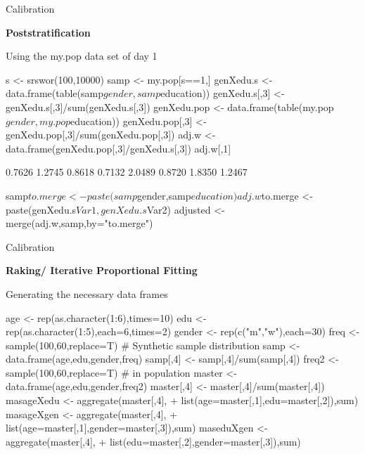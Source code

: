 \documentclass[11pt,german,hideothersubsections]{beamer}
\begin{document}
\begin{frame}[fragile]{Calibration}
\vspace{-.25cm}
\footnotesize{
\begin{center}
\textbf{Poststratification}
\end{center}

Using the my.pop data set of day 1
\begin{Schunk}
\begin{Sinput}
 s <- srswor(100,10000)
 samp <- my.pop[s==1,]
 genXedu.s <- data.frame(table(samp$gender,samp$education))
 genXedu.s[,3] <- genXedu.s[,3]/sum(genXedu.s[,3])
 genXedu.pop <- data.frame(table(my.pop$gender,my.pop$education))
 genXedu.pop[,3] <- genXedu.pop[,3]/sum(genXedu.pop[,3])
 adj.w <- data.frame(genXedu.pop[,3]/genXedu.s[,3])
 adj.w[,1]
\end{Sinput}
\begin{Soutput}
[1] 0.7626 1.2745 0.8618 0.7132 2.0489 0.8720 1.8350 1.2467
\end{Soutput}
\begin{Sinput}
 samp$to.merge <- paste(samp$gender,samp$education)
 adj.w$to.merge <- paste(genXedu.s$Var1,genXedu.s$Var2)
 adjusted <- merge(adj.w,samp,by="to.merge")
\end{Sinput}
\end{Schunk}
}
\end{frame}
\begin{frame}[fragile]{Calibration}
\vspace{-.25cm}
\footnotesize{
\begin{center}
\textbf{Raking/ Iterative Proportional Fitting}
\end{center}
Generating the necessary data frames
\begin{Schunk}
\begin{Sinput}
 age <- rep(as.character(1:6),times=10)
 edu <- rep(as.character(1:5),each=6,times=2)
 gender <- rep(c("m","w"),each=30)
 freq <- sample(100,60,replace=T)
 # Synthetic sample distribution
 samp <- data.frame(age,edu,gender,freq)
 samp[,4] <- samp[,4]/sum(samp[,4])
 freq2 <- sample(100,60,replace=T)
 # in population
 master <- data.frame(age,edu,gender,freq2)
 master[,4] <- master[,4]/sum(master[,4])
 masageXedu <- aggregate(master[,4],
+                         list(age=master[,1],edu=master[,2]),sum)
 masageXgen <- aggregate(master[,4],
+                         list(age=master[,1],gender=master[,3]),sum)
 maseduXgen <- aggregate(master[,4],
+                         list(edu=master[,2],gender=master[,3]),sum)
\end{Sinput}
\end{Schunk}
}
\end{frame}
\end{document}
